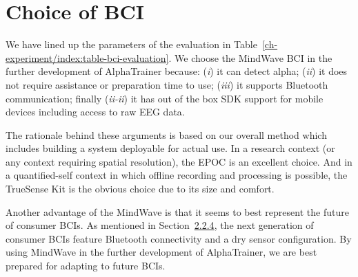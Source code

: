 \documentclass[a4paper,10pt,english,lof,lot,twoside]{puthesis}
\begin{document}
\section{Choice of BCI}
\label{ch-experiment/index:choice-of-bci}\label{ch-experiment/index:fig-final-experiment-recording-13}
We have lined up the parameters of the evaluation in Table \ref{ch-experiment/index:table-bci-evaluation}. We choose the MindWave BCI in the further
development of AlphaTrainer because: (\emph{i}) it can detect alpha; (\emph{ii}) it does
not require assistance or preparation time to use; (\emph{iii}) it supports Bluetooth
communication; finally (\emph{ii-ii}) it has out of the box SDK support for mobile
devices including access to raw EEG data.

The rationale behind these arguments is based on our overall method which
includes building a system deployable for actual use. In a research context (or
any context requiring spatial resolution), the EPOC is an excellent choice. And
in a quantified-self context in which offline recording and processing is
possible, the TrueSense Kit is the obvious choice due to its size and comfort.

Another advantage of the MindWave is that it seems to best represent the future
of consumer BCIs. As mentioned in Section {\hyperref[ch-background/index:ch-background-future-headsets]{2.2.4}}, the next generation of consumer BCIs
feature Bluetooth connectivity and a dry sensor configuration. By using MindWave
in the further development of AlphaTrainer, we are best prepared for adapting to
future BCIs.
\end{document}
